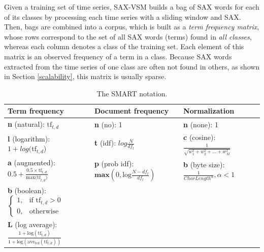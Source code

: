 Given a training set of time series, SAX-VSM builds a bag of SAX words for each of its classes by processing 
each time series with a sliding window and SAX. Then, bags are combined into a corpus, which is built as a 
\textit{term frequency matrix}, whose rows correspond to the set of all SAX words (terms) 
found in \textit{all classes}, whereas each column denotes a class of the training set. 
Each element of this matrix is an observed frequency of a term in a class. 
Because SAX words extracted from the time series of one class are often not 
found in others, as shown in Section \ref{scalability}, this matrix is usually sparse. 

\begin{table}
\caption{The SMART notation. }
\vspace{0.4cm}
\label{tbl:smart}
{\footnotesize
\begin{tabularx}{\textwidth}{l l l}
\toprule[1pt]
\textbf{Term frequency} &\textbf{Document frequency} &\textbf{Normalization} \\[0.5ex]
\midrule
\textbf{n} (natural):  $\text{tf}_{t,d}$ & \textbf{n} (no): 1 & \textbf{n} (none): 1 \\[2ex]
\textbf{l} (logarithm): $1+log(\text{tf}_{t,d}$) & \textbf{t} (idf): $log\tfrac{N}{df_{t}}$ & \textbf{c} (cosine): $\tfrac{1}{\sqrt{w_1^2 + w_2^2 + ... + w_M^2}}$ \\[2ex]
\textbf{a} (augmented): $0.5 + \tfrac{0.5 \times \text{tf}_{t,d}}{\text{max(tf}_{t,d})}$ & \textbf{p} (prob idf): $\textbf{max}\left( 0,\text{log}\tfrac{N-df_{t}}{df_{t}} \right) $ & 
\textbf{b} (byte size): $\tfrac{1}{CharLength^\alpha}, \alpha < 1 $ \\[2ex]
\textbf{b} (boolean): $\begin{cases} 1, & \text{if tf}_{t,d} > 0 \\ 0, & \text{otherwise} \end{cases} $ & & \\[3ex]
\textbf{L} (log average): $ \tfrac{1+\text{log}(\text{tf}_{t,d})}{1+\text{log}(\text{ave}_{t \epsilon d}( \text{tf}_{t,d}))}$ & & \\[1ex]
\bottomrule[1pt]
\end{tabularx}
}
\end{table}

